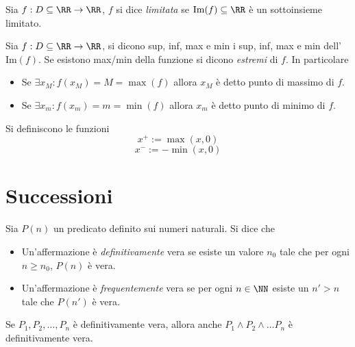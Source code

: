 \documentclass[11pt]{scrartcl}
\begin{document}
	\begin{definition}
		Sia $f:D\subseteq\RR\to\RR$, $f$ si dice \textit{limitata} se $\text{Im}(f)\subseteq \RR$ è un sottoinsieme limitato.
	\end{definition}
	\begin{definition}
		Sia $f:D\subseteq\RR\to\RR$, si dicono sup, inf, max e min i sup, inf, max e min dell' $\text{Im}(f)$.
		Se esistono max/min della funzione si dicono \textit{estremi} di $f$. In particolare
		\begin{itemize}
			\item Se $\exists x_M:f(x_M)=M=\max(f)$ allora $x_M$ è detto punto di massimo di $f$.
			\item Se $\exists x_m:f(x_m)=m=\min(f)$ allora $x_m$ è detto punto di minimo di $f$.
		\end{itemize}
	\end{definition}
	
	\begin{definition}[Funzioni + e -]
		Si definiscono le funzioni
		$$x^+:=\max(x,0)$$
		$$x^-:=-\min(x,0)$$
	\end{definition}
	
	\newpage
	
	\section{Successioni}
	\begin{definition}
		Sia $P(n)$ un predicato definito sui numeri naturali. Si dice che 
		\begin{itemize}
			\item Un'affermazione è \textit{definitivamente} vera se esiste un valore $n_0$ tale che per ogni $n\ge n_0$, $P(n)$ è vera.
			\item Un'affermazione è \textit{frequentemente} vera se per ogni $n\in\NN$ esiste un $n'>n$ tale che $P(n')$ è vera. 
		\end{itemize}
	\end{definition}
	\begin{proposition}
		Se $P_1,P_2,\dots,P_n$ è definitivamente vera, allora anche $P_1\land P_2 \land \dots P_n$ è definitivamente vera.
	\end{proposition}
	
\end{document}
